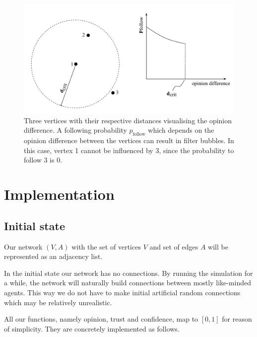 \documentclass[11pt]{article}
\begin{document}
    

\begin{figure}[H]
    \centering
    \includegraphics[width = .6\linewidth]{img/p_follow_visual.pdf}
    
    \caption{Three vertices with their respective distances visualising the opinion difference. A following probability $p_\mathrm{follow}$ which depends on the opinion difference between the vertices can result in filter bubbles. In this case, vertex 1 cannot be influenced by 3, since the probability to follow 3 is 0.}
    \label{fig:p_follow}
\end{figure}

\section{Implementation}\label{sec:implementation}
\subsection{Initial state}
Our network \((V, A)\) with the set of vertices \(V\) and set of edges \(A\) will be represented as an adjacency list.\par
In the initial state our network has no connections. By running the simulation for a while, the network will naturally build connections between mostly like-minded agents. This way we do not have to make initial artificial random connections which may be relatively unrealistic.\par
All our functions, namely opinion, trust and confidence, map to \([0,1]\) for reason of simplicity. They are concretely implemented as follows.
\end{document}
